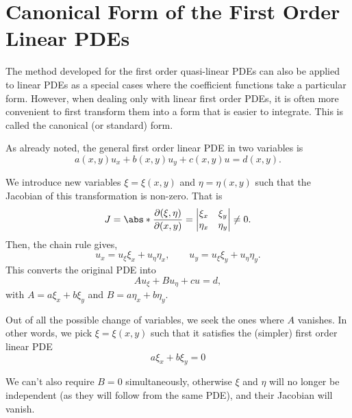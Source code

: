 \documentclass[11pt]{penrose}
\begin{document}

\section{Canonical Form of the First Order Linear PDEs}
The method developed for the first order quasi-linear PDEs can also be applied to linear PDEs as a special cases where the coefficient functions take a particular form. However, when dealing only with linear first order PDEs, it is often more convenient to first transform them into a form that is easier to integrate. This is called the canonical (or standard) form.

As already noted, the general first order linear PDE in two variables is
\begin{equation}
    a(x,y) u_x + b(x,y) u_y + c(x,y) u = d(x,y).
\end{equation}

We introduce new variables $\xi = \xi(x,y)$ and $\eta = \eta(x,y)$ such that the Jacobian of this transformation is non-zero. That is
\begin{equation}
    J = \abs*{\frac{\pd(\xi, \eta)}{\pd(x,y)}} =
    \begin{vmatrix}
        \xi_x & \xi_y \\ \eta_x & \eta_y
    \end{vmatrix}
    \neq 0.
\end{equation}
Then, the chain rule gives,
\begin{equation}
    u_x = u_\xi \xi_x + u_\eta \eta_x,
    \qquad
    u_y = u_\xi \xi_y + u_\eta \eta_y.
\end{equation}
This converts the original PDE into
\begin{equation}
    A u_\xi + B u_\eta + cu = d,
\end{equation}
with $A = a \xi_x + b \xi_y$ and $B = a \eta_x + b \eta_y$.

Out of all the possible change of variables, we seek the ones where $A$ vanishes. In other words, we pick $\xi = \xi(x,y)$ such that it satisfies the (simpler) first order linear PDE
\begin{equation}
    a \xi_x + b \xi_y = 0
\end{equation}

We can't also require $B = 0$ simultaneously, otherwise $\xi$ and $\eta$ will no longer be independent (as they will follow from the same PDE), and their Jacobian will vanish.
\end{document}
